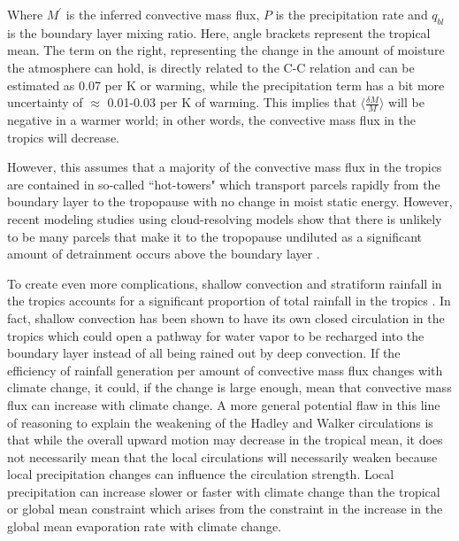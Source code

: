 \documentclass[letterpaper,12pt,titlepage,oneside,final]{book}
\begin{document}
Where $M^{'}$ is the inferred convective mass flux, $P$ is the precipitation rate and $q_{bl}$ is the boundary layer mixing ratio. Here, angle brackets represent the tropical mean. The term on the right, representing the change in the amount of moisture the atmosphere can hold, is directly related to the C-C relation and can be estimated as 0.07 per K or warming, while the precipitation term has a bit more uncertainty of $\approx$ 0.01-0.03 per K of warming. This implies that $\langle\frac{\delta{M}}{M}\rangle$ will be negative in a warmer world; in other words, the convective mass flux in the tropics will decrease. 

However, this assumes that a majority of the convective mass flux in the tropics are contained in so-called ``hot-towers" \citep{riehl_and_malkus_heat_1958} which transport parcels rapidly from the boundary layer to the tropopause with no change in moist static energy. However, recent modeling studies using cloud-resolving models show that there is unlikely to be many parcels that make it to the tropopause undiluted \citep{romps_undiluted_2010} as a significant amount of detrainment occurs above the boundary layer \citep{romps_direct_2010}. 

To create even more complications, shallow convection and stratiform rainfall in the tropics accounts for a significant proportion of total rainfall in the tropics \citep{schumacher_stratiform_2003}. In fact, shallow convection has been shown to have its own closed circulation in the tropics \citep{folkins_ian_low-level_2008} which could open a pathway for water vapor to be recharged into the boundary layer instead of all being rained out by deep convection. If the efficiency of rainfall generation per amount of convective mass flux changes with climate change, it could, if the change is large enough, mean that convective mass flux can increase with climate change. A more general potential flaw in this line of reasoning to explain the weakening of the Hadley and Walker circulations is that while the overall upward motion may decrease in the tropical mean, it does not necessarily mean that the local circulations will necessarily weaken \citep{merlis_changes_2011} because local precipitation changes can influence the circulation strength. Local precipitation can increase slower or faster with climate change than the tropical or global mean constraint which arises from the constraint in the increase in the global mean evaporation rate with climate change. 
\end{document}
